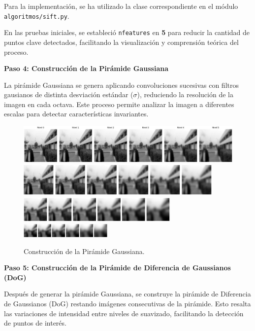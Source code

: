 \documentclass[a4paper]{article}
\begin{document}
Para la implementación, se ha utilizado la clase correspondiente en el módulo \texttt{algoritmos/sift.py}. 
\par\vspace{0.5cm}
En las pruebas iniciales, se estableció \texttt{nfeatures} en \textbf{5} para reducir la cantidad de puntos clave detectados, 
facilitando la visualización y comprensión teórica del proceso.
\par\vspace{0.5cm}

\textbf{Paso 4: Construcción de la Pirámide Gaussiana}
\par\vspace{0.5cm}

La pirámide Gaussiana se genera aplicando convoluciones sucesivas con filtros gausianos de distinta desviación estándar (\(\sigma\)), reduciendo la resolución de la imagen en cada octava. Este proceso permite analizar la imagen a diferentes escalas para detectar características invariantes.

\begin{figure}[H]
    \centering
    \includegraphics[width=1.1\textwidth]{images/sift_paso_3.1.png}
    \includegraphics[width=0.9\textwidth]{images/sift_paso_3.2.png}
    \includegraphics[width=0.7\textwidth]{images/sift_paso_3.3.png}
    \includegraphics[width=0.4\textwidth]{images/sift_paso_3.4.png}
    \caption{Construcción de la Pirámide Gaussiana.}
\end{figure}

\textbf{Paso 5: Construcción de la Pirámide de Diferencia de Gaussianos (DoG)}

Después de generar la pirámide Gaussiana, se construye la pirámide de Diferencia de Gaussianos (DoG) restando imágenes consecutivas de la pirámide. Esto resalta las variaciones de intensidad entre niveles de suavizado, facilitando la detección de puntos de interés.
\end{document}
